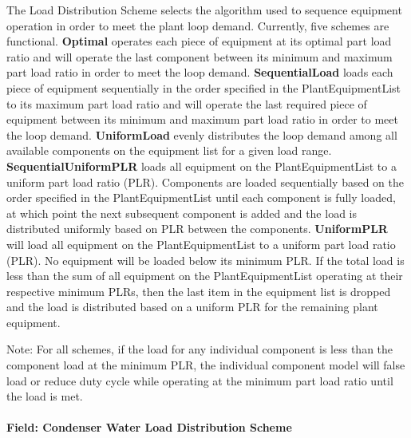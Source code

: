 The Load Distribution Scheme selects the algorithm used to sequence equipment operation in order to meet the plant loop demand. Currently, five schemes are functional. \textbf{Optimal} operates each piece of equipment at its optimal part load ratio and will operate the last component between its minimum and maximum part load ratio in order to meet the loop demand. \textbf{SequentialLoad} loads each piece of equipment sequentially in the order specified in the PlantEquipmentList to its maximum part load ratio and will operate the last required piece of equipment between its minimum and maximum part load ratio in order to meet the loop demand. \textbf{UniformLoad} evenly distributes the loop demand among all available components on the equipment list for a given load range. \textbf{SequentialUniformPLR} loads all equipment on the PlantEquipmentList to a uniform part load ratio (PLR). Components are loaded sequentially based on the order specified in the PlantEquipmentList until each component is fully loaded, at which point the next subsequent component is added and the load is distributed uniformly based on PLR between the components. \textbf{UniformPLR} will load all equipment on the PlantEquipmentList to a uniform part load ratio (PLR). No equipment will be loaded below its minimum PLR. If the total load is less than the sum of all equipment on the PlantEquipmentList operating at their respective minimum PLRs, then the last item in the equipment list is dropped and the load is distributed based on a uniform PLR for the remaining plant equipment.

Note: For all schemes, if the load for any individual component is less than the component load at the minimum PLR, the individual component model will false load or reduce duty cycle while operating at the minimum part load ratio until the load is met.

\paragraph{Field: Condenser Water Load Distribution Scheme}\label{field-condenser-water-load-distribution-scheme}

